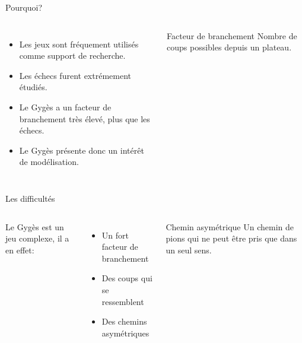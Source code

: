 \documentclass{beamer}
\begin{document}
	\begin{frame}{Pourquoi?}
		\begin{columns}
				\begin{itemize}
					\item<1-> Les jeux sont fréquement utilisés comme support de recherche.
					\vspace{0.75em}
					\item<2-> Les échecs furent extrémement étudiés.
					\vspace{0.75em}
					\item<3-> Le Gygès a un \alert{facteur de branchement} très élevé, plus que les échecs.
					\vspace{0.75em}
					\item<4-> Le Gygès présente donc un intérêt de modélisation.
				\end{itemize}

				 {
					\begin{alertblock}{Facteur de branchement}
					Nombre de coups possibles depuis un plateau.
					\end{alertblock}
				}
		\end{columns}
	\end{frame}

	\begin{frame}{Les difficultés} %
		\begin{columns}
			\column{0.5\textwidth}
				Le Gygès est un jeu complexe, il a en effet:

				\vspace{1em}
				\begin{itemize}
					\pause \item Un fort facteur de branchement
					\vspace{0.75em}
					\pause \item Des coups qui se ressemblent%
					\vspace{0.75em}
					\pause \item Des chemins asymétriques
				\end{itemize}

			\column{0.5\textwidth}
				\uncover<3-> {
					\begin{alertblock}{Chemin asymétrique}
						Un chemin de pions qui ne peut être pris
						que dans un seul sens.
					\end{alertblock}
				}
		\end{columns}
	\end{frame}
\end{document}
